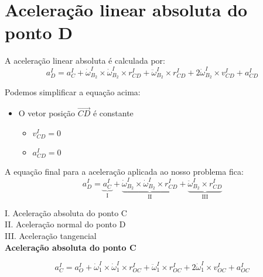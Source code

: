 \documentclass[a4paper, 12pt]{article}
\begin{document}
		
\section{Aceleração linear absoluta do ponto D}
	A aceleração linear absoluta é calculada por:
	\begin{equation}
		a^I_D = a^I_C + \dot{\omega}^I_{B_2} \times \dot{\omega}^I_{B_2} \times r^I_{CD} + \ddot{\omega}^I_{B_2} \times r^I_{CD} + 2 \dot{\omega}^I_{B_2} \times v^I_{CD} + a^I_{CD}
	\end{equation}
		
	Podemos simplificar a equação acima:
		\begin{itemize}
			\item O vetor posição $\vec{CD}$ é constante
				\begin{itemize}
					\item $v^I_{CD} = 0$
					\item $a^I_{CD} = 0$
				\end{itemize} 						
		\end{itemize}
		
		A equação final para a aceleração aplicada ao nosso problema fica:
		\begin{equation}
			a^I_D = \underbrace{a^I_C}_\text{I} + \underbrace{\dot{\omega}^I_{B_2} \times \dot{\omega}^I_{B_2} \times r^I_{CD}}_\text{II} + \underbrace{\ddot{\omega}^I_{B_2} \times r^I_{CD}}_\text{III}
		\end{equation}
		
		I. Aceleração absoluta do ponto C\\
		
		II. Aceleração normal do ponto D\\
		
		III. Aceleração tangencial\\
		
		\textbf{Aceleração absoluta do ponto C}
		
		\begin{equation}
			a^I_C = a^I_O + \dot{\omega}^I_1 \times \dot{\omega}^I_1 \times r^I_{OC} + \ddot{\omega}^I_1 \times r^I_{OC} + 2 \dot{\omega}^I_1 \times v^I_{OC} + a^I_{OC}
		\end{equation}
		
\end{document}
